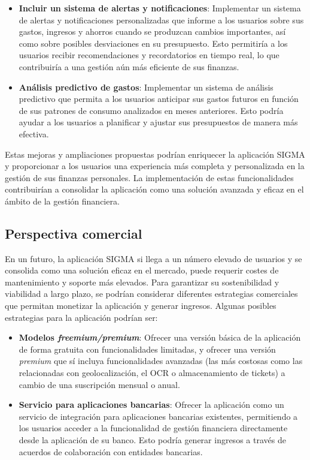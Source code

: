 \begin{itemize}
    \item \textbf{Incluir un sistema de alertas y notificaciones}: Implementar un sistema de alertas y notificaciones personalizadas que informe a los usuarios sobre sus gastos, ingresos y ahorros cuando se produzcan cambios importantes, así como sobre posibles desviaciones en su presupuesto. Esto permitiría a los usuarios recibir recomendaciones y recordatorios en tiempo real, lo que contribuiría a una gestión aún más eficiente de sus finanzas.
    \item \textbf{Análisis predictivo de gastos}: Implementar un sistema de análisis predictivo que permita a los usuarios anticipar sus gastos futuros en función de sus patrones de consumo analizados en meses anteriores. Esto podría ayudar a los usuarios a planificar y ajustar sus presupuestos de manera más efectiva.
\end{itemize}

Estas mejoras y ampliaciones propuestas podrían enriquecer la aplicación SIGMA y proporcionar a los usuarios una experiencia más completa y personalizada en la gestión de sus finanzas personales. La implementación de estas funcionalidades contribuirían a consolidar la aplicación como una solución avanzada y eficaz en el ámbito de la gestión financiera.


\subsection{Perspectiva comercial}
En un futuro, la aplicación SIGMA si llega a un número elevado de usuarios y se consolida como una solución eficaz en el mercado, puede requerir costes de mantenimiento y soporte más elevados. Para garantizar su sostenibilidad y viabilidad a largo plazo, se podrían considerar diferentes estrategias comerciales que permitan monetizar la aplicación y generar ingresos. Algunas posibles estrategias para la aplicación podrían ser:

\begin{itemize}
    \item \textbf{Modelos \textit{freemium/premium}}: Ofrecer una versión básica de la aplicación de forma gratuita con funcionalidades limitadas, y ofrecer una versión \textit{premium} que sí incluya funcionalidades avanzadas (las más costosas como las relacionadas con geolocalización, el OCR o almacenamiento de tickets) a cambio de una suscripción mensual o anual.
    \item \textbf{Servicio para aplicaciones bancarias}: Ofrecer la aplicación como un servicio de integración para aplicaciones bancarias existentes, permitiendo a los usuarios acceder a la funcionalidad de gestión financiera directamente desde la aplicación de su banco. Esto podría generar ingresos a través de acuerdos de colaboración con entidades bancarias.
\end{itemize}

